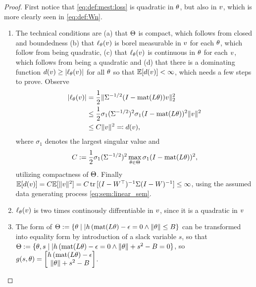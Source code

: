 \begin{proof}
First notice that \eqref{eq:def:mest:loss} is quadratic in $\theta$, but also in $v$, which is more clearly seen in \eqref{eq:def:Wn}.
\begin{enumerate}
    \item The technical conditions are (a) that $\Theta$ is compact, which follows from closed and boundedness (b) that $\ell_\theta(v)$ is borel measurable in $v$ for each $\theta$, which follow from being quadratic, (c) that $\ell_\theta(v)$ is continuous in $\theta$ for each $v$, which follows from being a quadratic and (d) that there is a dominating function $d(v)\geq |\ell_\theta(v)|$ for all $\theta$ so that $\mathbb{E}[d(v)] < \infty$, which needs a few steps to prove. Observe
    \begin{align}
    |\ell_\theta(v)|&=\frac{1}{2}\lVert\Sigma^{-1/2}(I-\operatorname*{mat}(L\theta))v\rVert_2^2\\
    &\leq\frac{1}{2}\sigma_1(\Sigma^{-1/2})^2\sigma_1(I-\operatorname*{mat}(L\theta))^2\lVert v\rVert^2\\
    & \leq C\lVert v\rVert^2\eqqcolon d(v),\end{align}
    where $\sigma_1$ denotes the largest singular value and \[C:=\frac{1}{2}\sigma_1(\Sigma^{-1/2})^2\max_{\theta \in \Theta} \sigma_1(I-\operatorname*{mat}(L\theta))^2 ,\]
    utilizing compactness of $\Theta$. Finally $\mathbb{E}[d(v)] = C\mathbb{E}[\lVert v\rVert^2] = C\operatorname*{tr}{}[(I-W^{\top})^{-1}\Sigma(I-W)^{-1}] \leq \infty$, using the assumed data generating process \eqref{eq:sem:linear_sem}.
    \item $\ell_\theta(v)$ is two times continously diffrentiable in $v$, since it is a quadratic in $v$
    \item The form of $\Theta:=\{\theta \mid| h\left(\operatorname*{mat}(L\theta\right)-\epsilon = 0 \land \lVert\theta\rVert\leq B \}$ can be transformed into equality form by introduction of a slack variable $s$, so that $\Theta:=\{\theta,s \mid| h\left(\operatorname*{mat}(L\theta\right)-\epsilon = 0 \land \lVert\theta\rVert+s^2-B=0 \}$, so $g(s,\theta)=\begin{bmatrix}h\left(\operatorname*{mat}(L\theta\right)-\epsilon \\ \lVert\theta\rVert+s^2-B\end{bmatrix}$.

\end{enumerate}
\end{proof}

